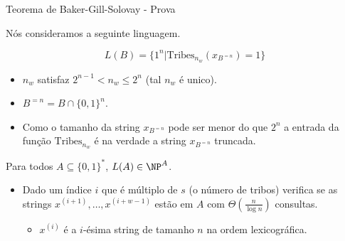 \documentclass[landscape, 9pt]{beamer}
\newcommand{\binalph}{\{0, 1\}}
\newcommand{\Tribes}{\text{Tribes}}
\begin{document}
\begin{frame} {Teorema de Baker-Gill-Solovay - Prova}

Nós consideramos a seguinte linguagem.

\begin{equation*}
	L(B) = \{1^{n} \lvert \Tribes_{n_{w}}(x_{B^{=n}}) = 1\}
\end{equation*}

\begin{itemize}

	\item $n_{w}$ satisfaz $2^{n - 1} < n_{w} \leq 2^{n}$ (tal $n_{w}$ é unico). 

	\item $B^{=n} = B \cap \binalph^{n}$.

	\item Como o tamanho da string $x_{B^{=n}}$ pode ser menor do que $2^{n}$ a entrada da função $\Tribes_{n_{w}}$ é na verdade a string $x_{B^{=n}}$ truncada.

\end{itemize}

Para todos $A \subseteq \binalph^{*}$, $L(A) \in \NP^{A}$.

\begin{itemize}

	\item Dado um índice $i$ que é múltiplo de $s$ (o número de tribos) verifica se as strings $x^{(i + 1)}, \dots, x^{(i + w - 1)}$ estão em $A$ com $\Theta(\frac{n}{\log n})$ consultas.
	
	\begin{itemize}
	
		\item $x^{(i)}$ é a $i$-ésima string de tamanho $n$ na ordem lexicográfica.

	\end{itemize}

\end{itemize}

\end{frame}

\end{document}
